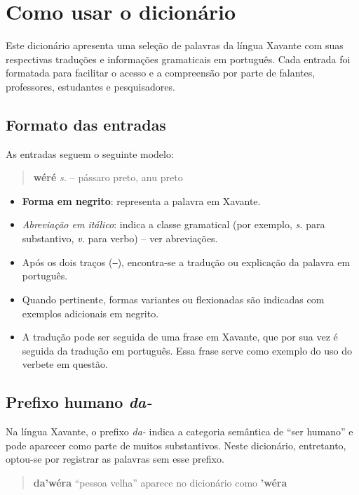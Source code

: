 \chapter*{Como usar o dicionário}

Este dicionário apresenta uma seleção de palavras da língua Xavante com suas respectivas traduções e informações gramaticais em português. Cada entrada foi formatada para facilitar o acesso e a compreensão por parte de falantes, professores, estudantes e pesquisadores.

\section*{Formato das entradas}

As entradas seguem o seguinte modelo:

\begin{quote}
\textbf{wéré} \textit{s.} -- pássaro preto, anu preto
\end{quote}

\begin{itemize}
  \item \textbf{Forma em negrito}: representa a palavra em Xavante.
  \item \textit{Abreviação em itálico}: indica a classe gramatical (por exemplo, \textit{s.} para substantivo, \textit{v.} para verbo) -- ver abreviações.
  \item Após os dois traços (\texttt{--}), encontra-se a tradução ou explicação da palavra em português.
  \item Quando pertinente, formas variantes ou flexionadas são indicadas com exemplos adicionais em negrito.
  \item A tradução pode ser seguida de uma frase em Xavante, que por sua vez é seguida da tradução em português. Essa frase serve como exemplo do uso do verbete em questão.

  
\end{itemize}

\section*{Prefixo humano \textit{da-}}

Na língua Xavante, o prefixo \textit{da-} indica a categoria semântica de “ser humano” e pode aparecer como parte de muitos substantivos. Neste dicionário, entretanto, optou-se por registrar as palavras sem esse prefixo.

\begin{quote}
\textbf{da’wéra} “pessoa velha” aparece no dicionário como \textbf{’wéra}
\end{quote}

